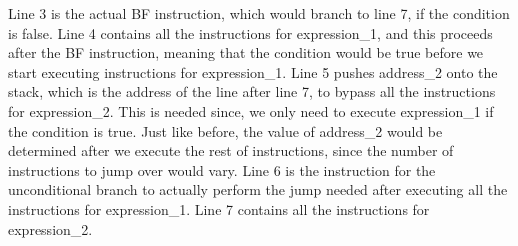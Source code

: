 \documentclass{article}
\begin{document}
Line 3 is the actual BF instruction, which would branch to line 7, if the condition is false. Line 4 contains all the instructions for expression\_1, and this proceeds after the BF instruction, meaning that the condition would be true before we start executing instructions for expression\_1. Line 5 pushes address\_2 onto the stack, which is the address of the line after line 7, to bypass all the instructions for expression\_2. This is needed since, we only need to execute expression\_1 if the condition is true. Just like before, the value of address\_2 would be determined after we execute the rest of instructions, since the number of instructions to jump over would vary. Line 6 is the instruction for the unconditional branch to actually perform the jump needed after executing all the instructions for expression\_1. Line 7 contains all the instructions for expression\_2.
\end{document}
